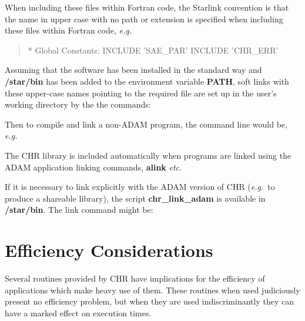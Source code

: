\documentclass[twoside,11pt,nolof]{starlink}
\begin{document}
When including these files within Fortran code, the Starlink convention
is that the name in upper case with no path or extension is specified when
including these files within Fortran code,
\emph{e.g.}
\begin{quote}
\begin{small}
\begin{terminalv}
*  Global Constants:
      INCLUDE 'SAE_PAR'
      INCLUDE 'CHR_ERR'
\end{terminalv}
\end{small}
\end{quote}
Assuming that the software has been installed in the standard way and
\textbf{/star/bin} has been added to the environment variable
\textbf{PATH}, soft links with these upper-case names pointing to the required
file are set up in the user's working directory by the the commands:
\begin {quote}
\begin{small}
\begin{terminalv}
\end{terminalv}
\end{small}
\end {quote}
Then to compile and link a non-ADAM program, the command line would be,
\emph{e.g.}
\begin {quote}
\begin{terminalv}
\end{terminalv}
\end {quote}
The CHR library is included automatically when programs are linked using the
ADAM application linking commands, \textbf{alink} \emph{etc}.

If it is necessary to link explicitly with the ADAM version of CHR
(\emph{e.g.}\ to produce a shareable library), the
script \textbf{chr\_link\_adam} is available in \textbf{/star/bin}.
The link command might be:
\begin {quote}
\begin {small}
\begin{terminalv}
\end{terminalv}
\end {small}
\end {quote}

\section{Efficiency Considerations}
Several routines provided by CHR have implications for the efficiency of
applications which make heavy use of them.
These routines when used judiciously present no efficiency problem, but
when they are used indiscriminantly they can have a marked effect on
execution times.
\end{document}
